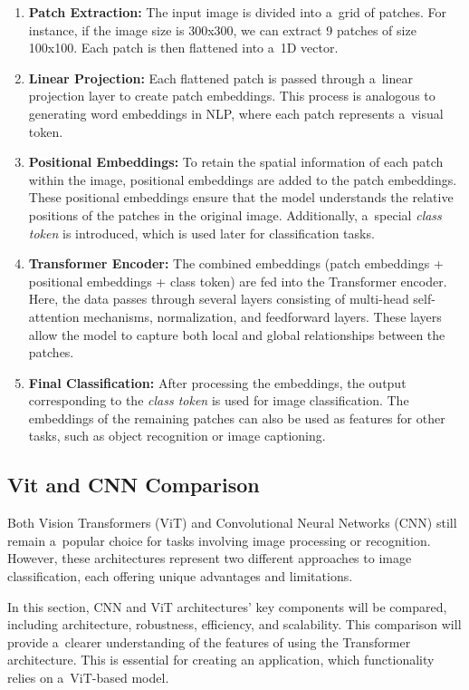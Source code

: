 \begin{enumerate}
    \item \textbf{Patch Extraction:} The input image is divided into a~grid of patches. For instance, if the image size is 300x300, we can extract 9 patches of size 100x100. Each patch is then flattened into a~1D vector.
    \item \textbf{Linear Projection:} Each flattened patch is passed through a~linear projection layer to create patch embeddings. This process is analogous to generating word embeddings in NLP, where each patch represents a~visual token.
    \item \textbf{Positional Embeddings:} To retain the spatial information of each patch within the image, positional embeddings are added to the patch embeddings. These positional embeddings ensure that the model understands the relative positions of the patches in the original image. Additionally, a~special \textit{class token} is introduced, which is used later for classification tasks.
    \item \textbf{Transformer Encoder:} The combined embeddings (patch embeddings + positional embeddings + class token) are fed into the Transformer encoder. Here, the data passes through several layers consisting of multi-head self-attention mechanisms, normalization, and feedforward layers. These layers allow the model to capture both local and global relationships between the patches.
    \item \textbf{Final Classification:} After processing the embeddings, the output corresponding to the \textit{class token} is used for image classification. The embeddings of the remaining patches can also be used as features for other tasks, such as object recognition or image captioning.
\end{enumerate}

\subsection*{Vit and CNN Comparison}
\label{sec:vit-cnn-comparison}

Both Vision Transformers (ViT) and Convolutional Neural Networks (CNN) still remain a~popular choice for tasks involving image processing or recognition. However, these architectures represent two different approaches to image classification, each offering unique advantages and limitations. 

\medskip

In this section, CNN and ViT architectures' key components will be compared, including architecture, robustness, efficiency, and scalability. This comparison will provide a~clearer understanding of the features of using the Transformer architecture. This is essential for creating an application, which functionality relies on a~ViT-based model.

